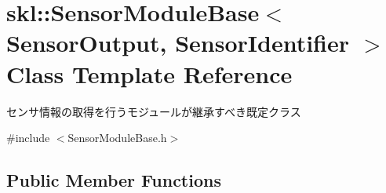\hypertarget{classskl_1_1_sensor_module_base}{}\section{skl\+:\+:Sensor\+Module\+Base$<$ Sensor\+Output, Sensor\+Identifier $>$ Class Template Reference}
\label{classskl_1_1_sensor_module_base}


センサ情報の取得を行うモジュールが継承すべき既定クラス  




{\ttfamily \#include $<$Sensor\+Module\+Base.\+h$>$}

\subsection*{Public Member Functions}
